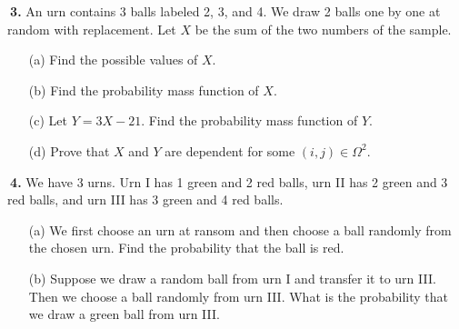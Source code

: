 \documentclass[12pt]{report}
\begin{document}
\noindent {} $~$\textbf{3.} An urn contains 3 balls labeled 2, 3, and 4. We draw 2 balls one by one at random with replacement. Let $X$ be the sum of the two numbers of the sample.
\begin{itemize}
\item [(a)] Find the possible values of $X$.		%
\item [(b)] Find the probability mass function of $X$.
\item [(c)] Let $Y=3X-21$. Find the probability mass function of $Y$.
\item [(d)] Prove that $X$ and $Y$ are dependent for some $(i,j)\in\Omega^2$.
\end{itemize}
%
%
%
\pagebreak







\noindent {} $~$\textbf{4.} We have 3 urns. Urn I has 1 green and 2 red balls, urn II has 2 green and 3 red balls, and urn III has 3 green and 4 red balls. 
\begin{itemize}
\item [(a)] We first choose an urn at ransom and then choose a ball randomly from the chosen urn. Find the probability that the ball is red. %
\item [(b)] Suppose we draw a random ball from urn I and transfer it to urn III. Then we choose a ball randomly from urn III. What is the probability that we draw a green ball from urn III.
\end{itemize}
\pagebreak
\end{document}
